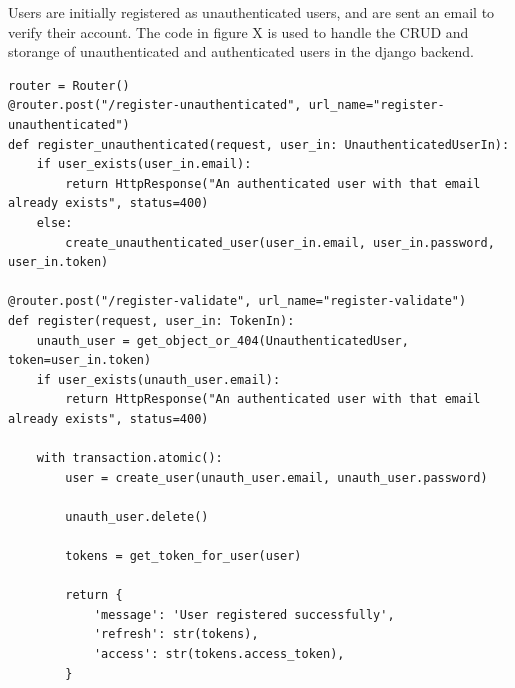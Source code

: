 \begin{minipage}[t]{0.47\textwidth} %
    \vspace{0.5em}
    Users are initially registered as unauthenticated users, and are sent an email to verify their account. The code in figure X is used to handle the CRUD and storange of unauthenticated and authenticated users in the django backend.
\end{minipage}
\hfill
\begin{minipage}[t]{0.47\textwidth} %
\begin{verbatim}
router = Router()
@router.post("/register-unauthenticated", url_name="register-unauthenticated")
def register_unauthenticated(request, user_in: UnauthenticatedUserIn):
    if user_exists(user_in.email):
        return HttpResponse("An authenticated user with that email already exists", status=400)
    else:
        create_unauthenticated_user(user_in.email, user_in.password, user_in.token)

@router.post("/register-validate", url_name="register-validate")
def register(request, user_in: TokenIn):
    unauth_user = get_object_or_404(UnauthenticatedUser, token=user_in.token)
    if user_exists(unauth_user.email):
        return HttpResponse("An authenticated user with that email already exists", status=400)
        
    with transaction.atomic():
        user = create_user(unauth_user.email, unauth_user.password)
        
        unauth_user.delete()

        tokens = get_token_for_user(user)

        return {
            'message': 'User registered successfully',
            'refresh': str(tokens),
            'access': str(tokens.access_token),
        }
\end{verbatim}
\end{minipage}